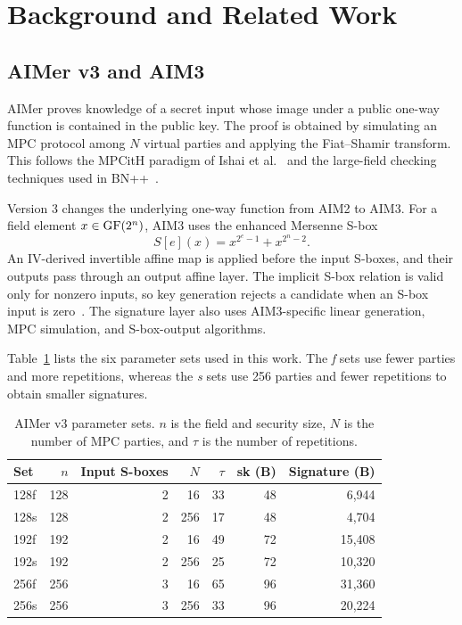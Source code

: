 \section{Background and Related Work}
\label{sec:bg}

\subsection{AIMer v3 and AIM3}

AIMer proves knowledge of a secret input whose image under a public one-way
function is contained in the public key.  The proof is obtained by simulating
an MPC protocol among $N$ virtual parties and applying the Fiat--Shamir
transform.  This follows the MPCitH paradigm of Ishai et
al.~\cite{ishai2007zero} and the large-field checking techniques used in
BN++~\cite{kales2022efficient}.

Version 3 changes the underlying one-way function from AIM2 to AIM3.  For a
field element $x\in\operatorname{GF}\!\left(2^{n}\right)$, AIM3 uses the enhanced Mersenne S-box
\begin{equation}
  S[e](x)=x^{2^e-1}+x^{2^n-2}.
\end{equation}
An IV-derived invertible affine map is applied before the input S-boxes, and
their outputs pass through an output affine layer.  The implicit S-box relation
is valid only for nonzero inputs, so key generation rejects a candidate when an
S-box input is zero~\cite{cho2026aimer3}.  The signature layer also uses
AIM3-specific linear generation, MPC simulation, and S-box-output algorithms.

Table~\ref{tab:params} lists the six parameter sets used in this work.  The
\emph{f} sets use fewer parties and more repetitions, whereas the \emph{s} sets
use 256 parties and fewer repetitions to obtain smaller signatures.

\begin{table}[t]
\centering
\caption{AIMer v3 parameter sets.  $n$ is the field and security size, $N$ is
the number of MPC parties, and $\tau$ is the number of repetitions.}
\label{tab:params}
\small
\setlength{\tabcolsep}{5.5pt}
\begin{tabular}{lrrrrrr}
\toprule
Set & $n$ & Input S-boxes & $N$ & $\tau$ & sk (B) & Signature (B)\\
\midrule
128f & 128 & 2 & 16  & 33 & 48 & 6,944\\
128s & 128 & 2 & 256 & 17 & 48 & 4,704\\
192f & 192 & 2 & 16  & 49 & 72 & 15,408\\
192s & 192 & 2 & 256 & 25 & 72 & 10,320\\
256f & 256 & 3 & 16  & 65 & 96 & 31,360\\
256s & 256 & 3 & 256 & 33 & 96 & 20,224\\
\bottomrule
\end{tabular}
\end{table}

